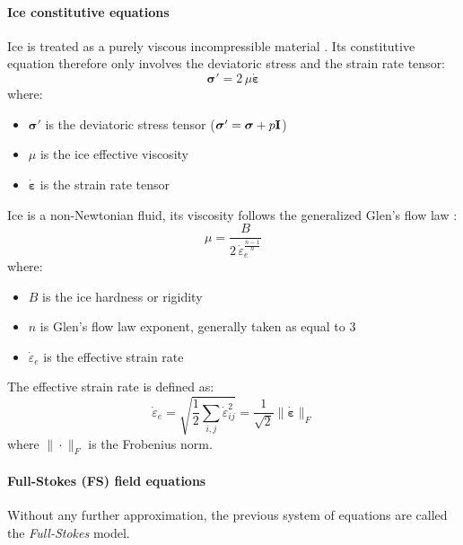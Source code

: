 \paragraph{Ice constitutive equations}
Ice is treated as a purely viscous incompressible material \cite{Cuffey2010}. Its constitutive equation therefore only involves the deviatoric stress and the strain rate tensor:
\begin{equation}
	\boldsymbol{\sigma}' = 2\,\mu\dot{\boldsymbol{\varepsilon}}
\end{equation}
where:
\begin{itemize}
	\item $\boldsymbol{\sigma}'$ is the deviatoric stress tensor ($\boldsymbol{\sigma}' = \boldsymbol{\sigma} + p {\bf I}$)
	\item $\mu$ is the ice effective viscosity
	\item $\dot{\boldsymbol{\varepsilon}}$ is the strain rate tensor
\end{itemize}
Ice is a non-Newtonian fluid, its viscosity follows the generalized Glen's flow law \cite{Glen1955}:
\begin{equation}
	\mu = \frac{B}{2\,\dot{\varepsilon}_e^{\frac{n-1}{n}}}
\end{equation}
where:
\begin{itemize}
	\item $B$ is the ice hardness or rigidity
	\item $n$ is Glen's flow law exponent, generally taken as equal to 3
	\item $\dot{\varepsilon}_e$ is the effective strain rate
\end{itemize}
The effective strain rate is defined as:
\begin{equation}
	\dot{\varepsilon}_e = \sqrt{\frac{1}{2} \sum_{i,j} \dot{\varepsilon}_{ij}^2}= \frac{1}{\sqrt{2}} \|\dot{\boldsymbol{\varepsilon}}\|_F
\end{equation}
where $\|\cdot\|_F$ is the Frobenius norm.

\paragraph{Full-Stokes (FS) field equations}
Without any further approximation, the previous system of equations are called the \emph{Full-Stokes} model.

